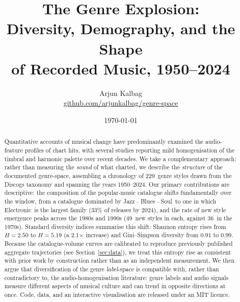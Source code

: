 \documentclass[12pt, a4paper]{article}
\newcommand{\gsYearMin}{1950}%
\newcommand{\gsYearMax}{2024}%
\newcommand{\gsNStyles}{229}%
\newcommand{\gsShannonFirst}{2.50}%
\newcommand{\gsShannonLast}{5.19}%
\newcommand{\gsShannonGrowth}{2.1}%
\newcommand{\gsSimpsonFirst}{0.91}%
\newcommand{\gsSimpsonLast}{0.99}%
\newcommand{\gsPeakBirthCount}{49}%
\newcommand{\gsPrevDecade}{1970s}%
\newcommand{\gsPrevDecadeCount}{36}%
\newcommand{\gsTopFamFirst}{Jazz $\cdot$ Blues $\cdot$ Soul}%
\newcommand{\gsTopFamLast}{Electronic}%
\newcommand{\gsTopFamLastShare}{33}}
\begin{document}
\title{\textbf{The Genre Explosion:\\
  Diversity, Demography, and the Shape\\
  of Recorded Music, \gsYearMin--\gsYearMax}}

\author{Arjun Kalbag\\
  \small\href{https://github.com/arjunkalbag/genre-space}{github.com/arjunkalbag/genre-space}}

\date{\today}
\maketitle
\thispagestyle{fancy}

\begin{abstract}
\noindent
Quantitative accounts of musical change have predominantly examined the
audio-feature profiles of chart hits, with several studies reporting mild
homogenisation of the timbral and harmonic palette over recent decades.
We take a complementary approach: rather than measuring the \emph{sound} of
what charted, we describe the \emph{structure} of the documented genre-space,
assembling a chronology of \gsNStyles\ genre styles drawn from the Discogs
taxonomy and spanning the years \gsYearMin--\gsYearMax. Our primary
contributions are descriptive: the composition of the popular-music
catalogue shifts fundamentally over the window, from a catalogue dominated
by \gsTopFamFirst\ to one in which \gsTopFamLast\ is the largest family
(\gsTopFamLastShare\% of releases by \gsYearMax), and the rate of new style
emergence peaks across the 1980s and 1990s (\gsPeakBirthCount\ new styles in
each, against \gsPrevDecadeCount\ in the \gsPrevDecade). Standard diversity
indices summarise this shift: Shannon entropy rises from
$H = \gsShannonFirst$ to $H = \gsShannonLast$ (a \gsShannonGrowth$\times$
increase) and Gini--Simpson diversity from $\gsSimpsonFirst$ to
$\gsSimpsonLast$. Because the catalogue-volume curves are calibrated to
reproduce previously published aggregate trajectories
(see Section~\ref{sec:data}), we treat this entropy rise as consistent with
prior work by construction rather than as an independent measurement.
We then argue that diversification of the genre \emph{label}-space is
compatible with, rather than contradictory to, the audio-homogenisation
literature: genre labels and audio signals measure different aspects of
musical culture and can trend in opposite directions at once. Code, data,
and an interactive visualisation are released under an MIT licence.
\end{abstract}
\end{document}

